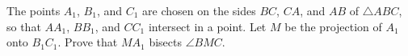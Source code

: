 The points $A_1$, $B_1$, and $C_1$ are chosen on the sides $BC$, $CA$, and $AB$ of $\triangle ABC$, so that $AA_1$, $BB_1$, and $CC_1$ intersect in a point. Let $M$ be the projection of $A_1$ onto $B_1C_1$. Prove that $MA_1$ bisects $\angle BMC$.
